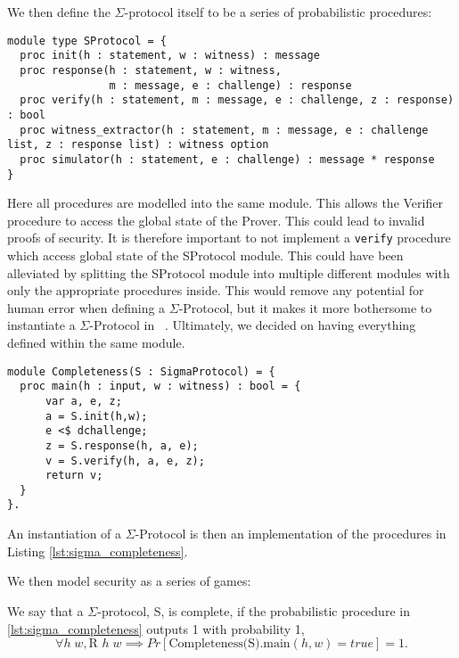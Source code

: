 We then define the $\Sigma$-protocol itself to be a series of probabilistic procedures:
\begin{lstlisting}[label=lst:sigma_procedures,caption= Abstract procedures of $\Sigma$-Protocols]
module type SProtocol = {
  proc init(h : statement, w : witness) : message
  proc response(h : statement, w : witness,
                m : message, e : challenge) : response
  proc verify(h : statement, m : message, e : challenge, z : response) : bool
  proc witness_extractor(h : statement, m : message, e : challenge list, z : response list) : witness option
  proc simulator(h : statement, e : challenge) : message * response
}
\end{lstlisting}

Here all procedures are modelled into the same module. This allows the
Verifier procedure to access the global state of the Prover. This could lead to
invalid proofs of security. It is therefore important to not implement a
\texttt{verify} procedure which access global state of the SProtocol module.
This could have been alleviated by splitting the SProtocol module into multiple
different modules with only the appropriate procedures inside. This would remove
any potential for human error when defining a $\Sigma$-Protocol, but it makes it
more bothersome to instantiate a $\Sigma$-Protocol in \easycrypt\ . Ultimately,
we decided on having everything defined within the same module.


\begin{lstlisting}[float, label=lst:sigma_completeness,caption=Completeness game for $\Sigma$-Protocols]
module Completeness(S : SigmaProtocol) = {
  proc main(h : input, w : witness) : bool = {
      var a, e, z;
      a = S.init(h,w);
      e <$ dchallenge;
      z = S.response(h, a, e);
      v = S.verify(h, a, e, z);
      return v;
  }
}.
\end{lstlisting}

An instantiation of a $\Sigma$-Protocol is then an implementation of the
procedures in Listing \ref{lst:sigma_completeness}.

We then model security as a series of games:

\begin{definition}[Completeness]
\label{def:sigma:completeness}
  We say that a $\Sigma$-protocol, S, is complete, if the probabilistic procedure in
  \ref{lst:sigma_completeness} outputs 1 with probability 1, \ie
  \begin{equation}
    \label{eq:sigma_completeness}
    \forall h \; w, \text{R } h \; w \implies Pr[\text{Completeness(S).main}(h,w) = true] = 1.
  \end{equation}
\end{definition}

